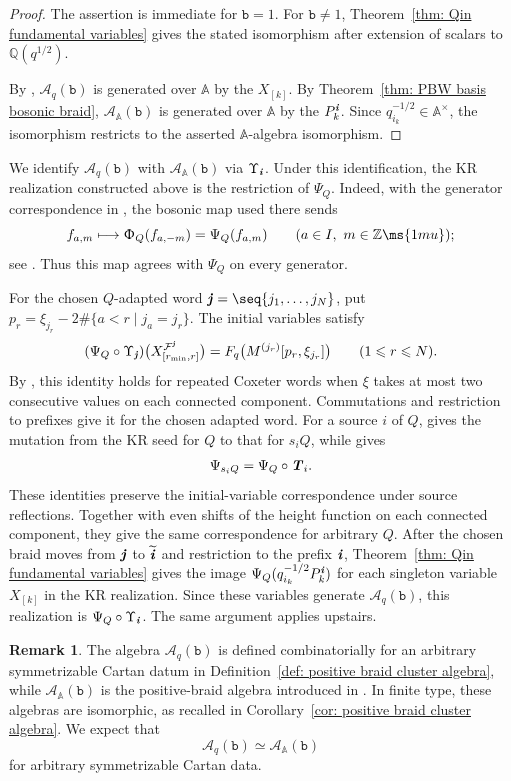 \documentclass[12pt, leqno]{amsart}
\numberwithin{equation}{section}
\theoremstyle{plain}
\theoremstyle{definition}
\newtheorem{remark}[lemma]{Remark}
\renewcommand{\le}{\leqslant}
\newcommand{\Q}{\mathbb{Q}}
\newcommand{\Z}{\mathbb{Z}\ms{1mu}}
\newcommand{\ii}{ \textbf{\textit{i}}}
\newcommand{\jj}{ \textbf{\textit{j}}}
\newcommand{\tii}{{\widetilde{\ii}}}
\newcommand{\bbA}{\mathbb{A}}
\newcommand{\calA}{\mathcal{A}}
\newcommand{\calF}{\mathcal{F}}
\newcommand{\scrA}{\mathscr{A}}
\newcommand{\ttb}{\mathtt{b}}
\newcommand{\TT}{ \textbf{\textit{T}}}
\begin{document}
\begin{proof}
The assertion is immediate for $\ttb=1$.
For $\ttb\ne1$, Theorem~\ref{thm: Qin fundamental variables}
gives the stated isomorphism after extension of scalars to
$\Q(q^{1/2})$.

By \cite[Theorem~8.10(1)]{Qin24A}, $\calA_q(\ttb)$ is
generated over $\bbA$ by the $X_{[k]}$.
By Theorem~\ref{thm: PBW basis bosonic braid},
$\scrA_\bbA(\ttb)$ is generated over $\bbA$ by the $P_k^\ii$.
Since $q_{i_k}^{-1/2}\in\bbA^\times$, the isomorphism restricts
to the asserted $\bbA$-algebra isomorphism.
\end{proof}
We identify $\calA_q(\ttb)$ with $\scrA_\bbA(\ttb)$ via
$\Upsilon_\ii$.  Under this identification, the KR realization
constructed above is the restriction of $\Psi_Q$.
Indeed, with the generator correspondence in
\cite[Section~6.1 and footnote~3]{Qin24B}, the bosonic
 map{} used there sends
\[
f_{a,m}\longmapsto\Upphi_Q(f_{a,-m})=\Psi_Q(f_{a,m})
\qquad(a\in I,\ m\in\Z);
\]
see \cite[(7.2) and Theorem~7.2]{JLO2}.
Thus this  map{} agrees with $\Psi_Q$ on every generator.

For the chosen $Q$-adapted word $\jj=\seq{j_1,\ldots,j_N}$,
put $p_r=\xi_{j_r}-2\#\{a<r\mid j_a=j_r\}$.  The initial
variables satisfy
\[
(\Psi_Q\circ\Upsilon_\jj)
\bigl(X^{\calF^\jj}_{[r_{\min},r]}\bigr)
=F_q\bigl(M^{(j_r)}[p_r,\xi_{j_r}]\bigr)
\qquad(1\le r\le N).
\]
By \cite[Lemma~5.10]{Qin24B}, this identity holds for repeated
Coxeter words when $\xi$ takes at most two consecutive values
on each connected component.  Commutations and
restriction to prefixes give it for the chosen adapted word.
For a source $i$ of $Q$, \cite[(8.16)]{JLO1} gives the mutation
from the KR seed for $Q$ to that for $s_iQ$, while
\cite[(6.3)]{Qin24B} gives
\[
\Psi_{s_iQ}=\Psi_Q\circ\TT_i.
\]
These identities preserve the initial-variable correspondence
under source reflections.  Together with even shifts of the
height function on each connected component, they give the
same correspondence for arbitrary $Q$.
After the chosen braid moves from $\jj$ to $\tii$ and
restriction to the prefix $\ii$,
Theorem~\ref{thm: Qin fundamental variables} gives the image
$\Psi_Q(q_{i_k}^{-1/2}P_k^\ii)$ for each singleton variable
$X_{[k]}$ in the KR realization.
Since these variables generate $\calA_q(\ttb)$, this
realization is $\Psi_Q\circ\Upsilon_\ii$.
The same argument applies upstairs.

\begin{remark}
The algebra $\calA_q(\ttb)$ is defined combinatorially for an
arbitrary symmetrizable Cartan datum in
Definition~\ref{def: positive braid cluster algebra}, while
$\scrA_{\bbA}(\ttb)$ is the positive-braid algebra introduced in
\cite{KKOP24B}. In finite type, these algebras are isomorphic, as
recalled in Corollary~\ref{cor: positive braid cluster algebra}.
We expect that
\[
\calA_q(\ttb)\simeq\scrA_{\bbA}(\ttb)
\]
for arbitrary symmetrizable Cartan data.
\end{remark}
\end{document}
